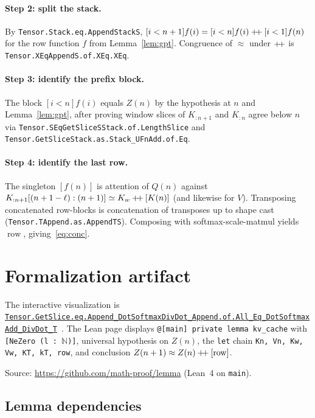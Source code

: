 \documentclass[11pt,a4paper]{article}
\newcommand{\rowop}{\operatorname{row}}
\newcommand{\concat}{\mathbin{+\mkern-4mu+}}
\newcommand{\XEq}{\approx}
\newcommand{\SEq}{\simeq}
\begin{document}
\paragraph{Step 2: split the stack.}
By \texttt{Tensor.Stack.eq.AppendStackS},
$[i<n+1]f(i)=[i<n]f(i)\concat[i<1]f(n)$ for the row function $f$ from Lemma~\ref{lem:gpt}.
Congruence of $\XEq$ under $\concat$ is \texttt{Tensor.XEqAppendS.of.XEq.XEq}.

\paragraph{Step 3: identify the prefix block.}
The block $[i<n]f(i)$ equals $Z(n)$ by the hypothesis at $n$ and Lemma~\ref{lem:gpt}, after proving window slices of $K_{:n+1}$ and $K_{:n}$ agree below $n$ via \texttt{Tensor.SEqGetSliceSStack.of.LengthSlice} and \texttt{Tensor.GetSliceStack.as.Stack\_UFnAdd.of.Eq}.

\paragraph{Step 4: identify the last row.}
The singleton $[f(n)]$ is attention of $Q(n)$ against
$K_{:n+1}[(n+1-\ell):(n+1)]\SEq K_w\concat[K(n)]$ (and likewise for $V$).
Transposing concatenated row-blocks is concatenation of transposes up to shape cast (\texttt{Tensor.TAppend.as.AppendTS}).
Composing with softmax-scale-matmul yields $\rowop$, giving~\eqref{eq:conc}.

\section{Formalization artifact}
\label{sec:artifact}

The interactive visualization is
\href{http://www.lemma.cn/lean/?module=Tensor.GetSlice.eq.Append_DotSoftmaxDivDot_Append.of.All_Eq_DotSoftmaxAdd_DivDot_T}{\texttt{Tensor.GetSlice.eq.Append\_DotSoftmaxDivDot\_Append.of.All\_Eq\_DotSoftmaxAdd\_DivDot\_T}}~\cite{lemma_kv_cache_lean}.
The Lean page displays \texttt{@[main] private lemma kv\_cache} with \texttt{[NeZero (l : $\mathbb{N}$)]}, universal hypothesis on $Z(n)$, the \texttt{let} chain \texttt{Kn, Vn, Kw, Vw, KT, kT, row}, and conclusion $Z(n+1)\XEq Z(n)\concat[\rowop]$.

Source: \url{https://github.com/math-proof/lemma} (Lean~4 on \texttt{main}).

\subsection{Lemma dependencies}
\label{sec:deps}
\end{document}
